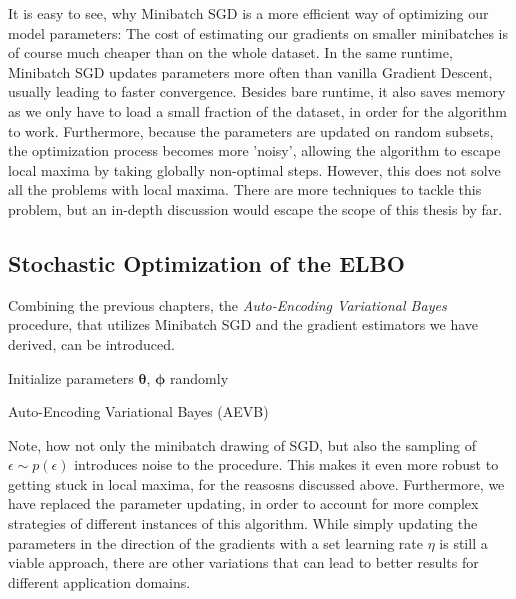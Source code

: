 \documentclass[12pt]{report}
\theoremstyle{definition}
\begin{document}
It is easy to see, why Minibatch SGD is a more efficient way of optimizing our model parameters: The cost of estimating our gradients on smaller minibatches is of course much cheaper than on the whole dataset. In the same runtime, Minibatch SGD updates parameters more often than vanilla Gradient Descent, usually leading to faster convergence. Besides bare runtime, it also saves memory as we only have to load a small fraction of the dataset, in order for the algorithm to work. Furthermore, because the  parameters are updated on random subsets, the optimization process becomes more 'noisy', allowing the algorithm to escape local maxima by taking globally non-optimal steps. However, this does not solve all the problems with local maxima. There are more techniques to tackle this problem, but an in-depth discussion would escape the scope of this thesis by far.

\subsection{Stochastic Optimization of the ELBO}
Combining the previous chapters, the \emph{Auto-Encoding Variational Bayes} procedure, that utilizes Minibatch SGD and the gradient estimators we have derived, can be introduced.

\begin{algorithm}[H]
\SetAlgoLined
Initialize parameters $\pmb{\theta}$, $\pmb{\phi}$ randomly\\
\caption{Auto-Encoding Variational Bayes (AEVB)}
\end{algorithm}
Note, how not only the minibatch drawing of SGD, but also the sampling of $\epsilon \sim p(\epsilon)$ introduces noise to the procedure. This makes it even more robust to getting stuck in local maxima, for the reasosns discussed above. Furthermore, we have replaced the parameter updating, in order to account for more complex strategies of different instances of this algorithm. While simply updating the parameters in the direction of the gradients with a set learning rate $\eta$ is still a viable approach, there are other variations that can lead to better results for different application domains.
\end{document}
